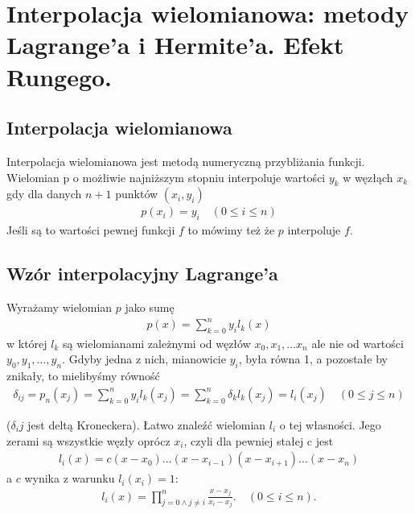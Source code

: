 \documentclass[12pt]{article}
\begin{document}
    \newpage

    \section{Interpolacja wielomianowa: metody Lagrange'a i Hermite'a. Efekt Rungego.}

    \subsection{Interpolacja wielomianowa}

    Interpolacja wielomianowa jest metodą numeryczną przybliżania funkcji.
    Wielomian p o możłiwie najniższym stopniu interpoluje wartości $y_k$ w węzłąch $x_k$ gdy dla danych $n+1$ punktów $(x_i, y_i)$
    \begin{align*}
        p(x_i)=y_i  \quad (0\leq i \leq n)
    \end{align*}
    Jeśli są to wartości pewnej funkcji $f$ to mówimy też że $p$ interpoluje $f$.

    \subsection{Wzór interpolacyjny Lagrange'a}

    Wyrażamy wielomian $p$ jako sumę
    \begin{align*}
        p(x)=\sum _{k=0}^{n}y_{i}l_k(x)
    \end{align*}
    w której $l_k$ są wielomianami zależnymi od węzłów $x_0,x_1, \dots x_n$ ale nie od wartości $y_0,y_1, \dots ,y_n$. Gdyby jedna z nich, mianowicie $y_i$, była równa 1, a pozostałe by znikały, to mielibyśmy równość
    \begin{align*}
        \delta_{ij} = p_n(x_j)=\sum _{k=0}^{n}y_{i}l_k(x_j)=\sum _{k=0}^{n}\delta_k l_k (x_j)=l_i(x_j) \quad (0 \leq j \leq n)
    \end{align*}

    ($\delta_ij$ jest deltą Kroneckera). Łatwo znaleźć wielomian $l_i$ o tej własności. Jego zerami są wszystkie węzły oprócz $x_i$, czyli dla pewniej stałej c jest
    \begin{align*}
        l_i(x)=c(x-x_0)\dots(x-x_{i-1})(x-x_{i+1})\dots(x-x_n)
    \end{align*}
    a $c$ wynika z warunku $l_i(x_i)=1$:
    \begin{align*}
        l_i(x)=\prod _{j=0\land j\neq i}^{n}{\frac {x-x_{j}}{x_{i}-x_{j}}}. \quad (0 \leq i \leq n).
    \end{align*}
\end{document}

